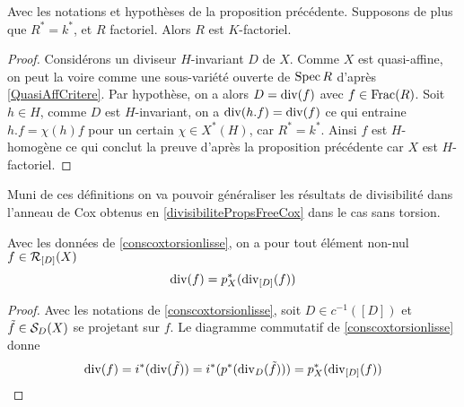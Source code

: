 \begin{cor}
Avec les notations et hypothèses de la proposition précédente. Supposons de plus que $R^*=k^*$, et $R$ factoriel. Alors $R$ est $K$-factoriel.
\end{cor}
\begin{proof}
Considérons un diviseur $H$-invariant $D$ de $X$. Comme $X$ est quasi-affine, on peut la voire comme une sous-variété ouverte de $\operatorname{Spec} R$ d'après \ref{QuasiAffCritere}. Par hypothèse, on a alors $D=\operatorname{div}(f)$ avec $f\in \operatorname{Frac}(R)$. Soit $h\in H$, comme $D$ est $H$-invariant, on a $\operatorname{div}(h.f)=\operatorname{div}(f)$ ce qui entraine $h.f=\chi(h)f$ pour un certain $\chi\in X^*(H)$, car $R^*=k^*$. Ainsi $f$ est $H$-homogène ce qui conclut la preuve d'après la proposition précédente car $X$ est $H$-factoriel.
\end{proof}

Muni de ces définitions on va pouvoir généraliser les résultats de divisibilité dans l'anneau de Cox obtenus en \ref{divisibilitePropsFreeCox} dans le cas sans torsion.

\begin{lem}
Avec les données de \ref{conscoxtorsionlisse}, on a pour tout élément non-nul $f\in \mathcal{R}_{[D]}(X)$
$$\operatorname{div}(f)=p^*_X(\operatorname{div}_{[D]}(f))$$
\end{lem}
\begin{proof}
Avec les notations de \ref{conscoxtorsionlisse}, soit $D\in c^{-1}([D])$ et $\tilde{f}\in\mathcal{S}_D(X)$ se projetant sur $f$. Le diagramme commutatif de \ref{conscoxtorsionlisse} donne
$$\operatorname{div}(f)=i^*(\operatorname{div}(\tilde{f}))=i^*(p^*(\operatorname{div}_D(\tilde{f})))=p_X^*(\operatorname{div}_{[D]}(f))$$
\end{proof}

